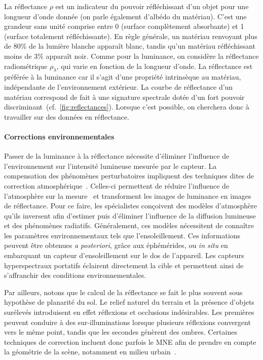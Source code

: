 La réflectance $\rho$ est un indicateur du pouvoir réfléchissant d'un objet pour une longueur d'onde donnée (on parle également d'albédo du matériau). C'est une grandeur sans unité comprise entre 0 (surface complètement absorbante) et 1 (surface totalement réfléchissante). En règle générale, un matériau renvoyant plus de 80\% de la lumière blanche apparaît blanc, tandis qu'un matériau réfléchissant moins de 3\% apparaît noir. Comme pour la luminance, on considère la réflectance radiométrique $\rho_\lambda$, qui varie en fonction de la longueur d'onde. La réflectance est préférée à la luminance car il s'agit d'une propriété intrinsèque au matériau, indépendante de l'environnement extérieur. La courbe de réflectance d'un matériau correspond de fait à une signature spectrale dotée d'un fort pouvoir discriminant~(cf.~\cref{fig:reflectances}). Lorsque c'est possible, on cherchera donc à travailler sur des données en réflectance.

\paragraph{Corrections environnementales}
Passer de la luminance à la réflectance nécessite d'éliminer l'influence de l'environnement sur l'intensité lumineuse mesurée par le capteur. La compensation des phénomènes perturbatoires impliquent des techniques dites de correction atmosphérique~\cite{deschamps_atmospheric_1980, rahman_smac_1994, chavez_image-based_1996}. Celles-ci permettent de réduire l'influence de l'atmosphère sur la mesure~\cite{gao_atmospheric_2009} et transforment les images de luminance en images de réflectance. Pour ce faire, les spécialistes conçoivent des modèles d'atmosphère qu'ils inversent afin d'estimer puis d'éliminer l'influence de la diffusion lumineuse et des phénomènes radiatifs. Généralement, ces modèles nécessitent de connaître les paramètres environnementaux tels que l'ensoleillement. Ces informations peuvent être obtenues \emph{a posteriori}, grâce aux éphémérides, ou \emph{in situ} en embarquant un capteur d'ensoleillement sur le dos de l'appareil. Les capteurs hyperspectraux portatifs éclairent directement la cible et permettent ainsi de s'affranchir des conditions environnementales.

Par ailleurs, notons que le calcul de la réflectance se fait le plus souvent sous hypothèse de planarité du sol. Le relief naturel du terrain et la présence d'objets surélevés introduisent en effet réflexions et occlusions indésirables. Les premières peuvent conduire à des sur-illuminations lorsque plusieurs réflexions convergent vers le même point, tandis que les secondes génèrent des ombres. Certaines techniques de correction incluent donc parfois le \gls{MNE} afin de prendre en compte la géométrie de la scène, notamment en milieu urbain~\cite{ceamanos_using_2017}.

